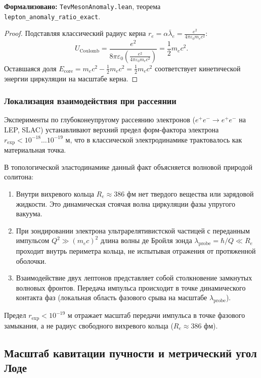 \documentclass[11pt,a4paper]{article}
\providecommand{\lambdabar}{\bar{\lambda}}
\theoremstyle{definition}
\theoremstyle{remark}
\begin{document}
\noindent\small\textbf{Формализовано:} \texttt{TevMesonAnomaly.lean}, теорема \texttt{lepton_anomaly_ratio_exact}.


\begin{proof}
Подставляя классический радиус керна $r_e = \alpha \lambdabar_e = \frac{e^2}{4\pi\varepsilon_0 m_e c^2}$:
\begin{equation}
	U_{\mathrm{Coulomb}} = \frac{e^2}{8\pi\varepsilon_0 \left(\frac{e^2}{4\pi\varepsilon_0 m_e c^2}\right)} = \frac{1}{2} m_e c^2.
\end{equation}
Оставшаяся доля $E_{\mathrm{core}} = m_e c^2 - \frac{1}{2}m_e c^2 = \frac{1}{2}m_e c^2$ соответствует кинетической энергии циркуляции на масштабе керна.
\end{proof}
	
\subsubsection{Локализация взаимодействия при рассеянии}
	
Эксперименты по глубоконеупругому рассеянию электронов ($e^+ e^- \to e^+ e^-$ на LEP, SLAC) устанавливают верхний предел форм-фактора электрона $r_{\mathrm{exp}} < 10^{-18}\dots 10^{-19}\text{ м}$, что в классической электродинамике трактовалось как материальная точка.
	
В топологической эластодинамике данный факт объясняется волновой природой солитона:
\begin{enumerate}
\item Внутри вихревого кольца $R_e \approx 386\text{ фм}$ нет твердого вещества или зарядовой жидкости. Это динамическая стоячая волна циркуляции фазы упругого вакуума.
\item При зондировании электрона ультрарелятивистской частицей с переданным импульсом $Q^2 \gg (m_e c)^2$ длина волны де Бройля зонда $\lambda_{\mathrm{probe}} = \hbar / Q \ll R_e$ проходит внутрь периметра кольца, не испытывая отражения от протяженной оболочки.
\item Взаимодействие двух лептонов представляет собой столкновение замкнутых волновых фронтов. Передача импульса происходит в точке динамического контакта фаз (локальная область фазового срыва на масштабе $\lambda_{\mathrm{probe}}$).
\end{enumerate}
Предел $r_{\mathrm{exp}} < 10^{-19}\text{ м}$ отражает масштаб передачи импульса в точке фазового замыкания, а не радиус свободного вихревого кольца ($R_e \approx 386\text{ фм}$).
	
\subsection{Масштаб кавитации пучности и метрический угол Лоде}
	
\end{document}
